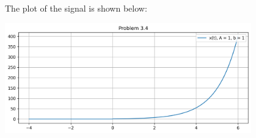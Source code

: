 \documentclass[a4paper, 10pt]{article}
\begin{document}
\begin{solution}
\newpage

The plot of the signal is shown below:
\begin{center}
    \includegraphics[width=0.8\textwidth]{images/problem_3_4.png}
\end{center}
\end{solution}
\end{document}
